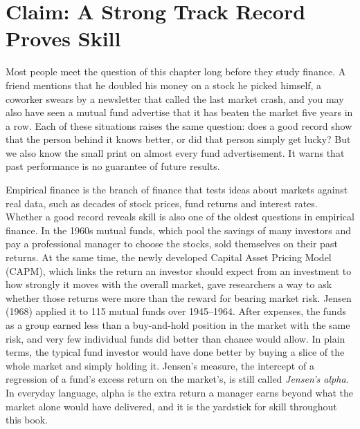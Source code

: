 \makeatletter
{}
\makeatother

\chapter{Claim: A Strong Track Record Proves Skill}
\label{ch:01}

Most people meet the question of this chapter long before they study finance. A friend mentions that he doubled his money on a stock he picked himself, a coworker swears by a newsletter that called the last market crash, and you may also have seen a mutual fund advertise that it has beaten the market five years in a row.
Each of these situations raises the same question: does a good record show that the person behind it knows better, or did that person simply get lucky? But we also know the small print on almost every fund advertisement. It warns that past performance is no guarantee of future results.

Empirical finance is the branch of finance that tests ideas about markets against real data, such as decades of stock prices, fund returns and interest rates.
Whether a good record reveals skill is also one of the oldest questions in empirical finance. In the 1960s mutual funds, which pool the savings of many investors and pay a professional manager to choose the stocks, sold themselves on their past returns. At the same time, the newly developed Capital Asset Pricing Model (CAPM), which links the return an investor should expect from an investment to how strongly it moves with the overall market, gave researchers a way to ask whether those returns were more than the reward for bearing market risk. Jensen (1968) applied it to 115 mutual funds over 1945--1964. After expenses, the funds as a group earned less than a buy-and-hold position in the market with the same risk, and very few individual funds did better than chance would allow. In plain terms, the typical fund investor would have done better by buying a slice of the whole market and simply holding it. Jensen's measure, the intercept of a regression of a fund's excess return on the market's, is still called \emph{Jensen's alpha}. In everyday language, alpha is the extra return a manager earns beyond what the market alone would have delivered, and it is the yardstick for skill throughout this book.

